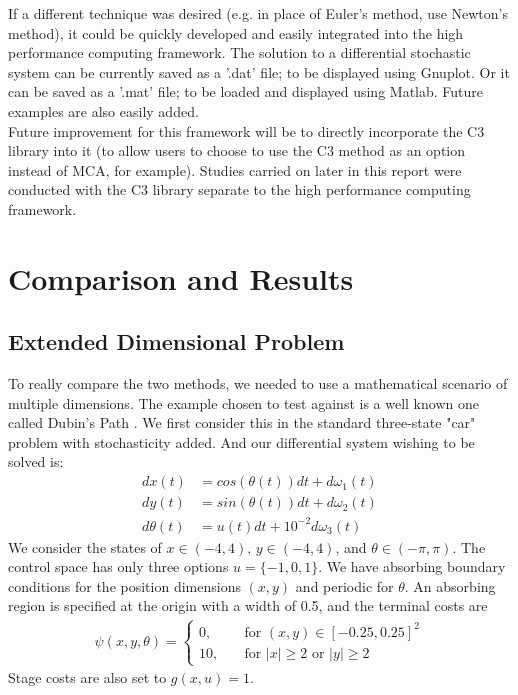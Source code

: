 \documentclass[11pt,draftd]{article}
\begin{document}
If a different technique was desired (e.g. in place of Euler's method, use Newton's method), it could be quickly developed and easily integrated into the high performance computing framework. The solution to a differential stochastic system can be currently saved as a '.dat' file; to be displayed using Gnuplot. Or it can be saved as a '.mat' file; to be loaded and displayed using Matlab. Future examples are also easily added. \\

Future improvement for this framework will be to directly incorporate the C3 library into it (to allow users to choose to use the C3 method as an option instead of MCA, for example). Studies carried on later in this report were conducted with the C3 library separate to the high performance computing framework.
\newpage

\section{Comparison and Results}
\subsection{Extended Dimensional Problem} 
To really compare the two methods, we needed to use a mathematical scenario of multiple dimensions. The example chosen to test against is a well known one called Dubin's Path \cite{reeds}. We first consider this in the standard three-state "car" problem with stochasticity added. And our differential system wishing to be solved is: 
\begin{align*} 
  dx(t) &= cos(\theta(t))dt + d\omega_1 (t) \\ 
  dy(t) &= sin(\theta(t))dt + d\omega_2 (t) \\ 
  d\theta(t) &= u(t)dt + 10^{-2}d\omega_3 (t) 
\end{align*} 
We consider the states of $ x \in (-4,4),\, y\in(-4,4) $, and $ \theta \in (-\pi,\pi) $. The control space has only three options $ u = \{-1, 0, 1\} $. We have absorbing boundary conditions for the position dimensions $ (x,y) $ and periodic for $ \theta $. An absorbing region is specified at the origin with a width of 0.5, and the terminal costs are 
\begin{align*} 
  \psi(x,y,\theta) = \begin{cases} 
  0, \quad & \text{for }(x,y)\in [-0.25, 0.25]^{2} \\ 
  10,\quad & \text{for }|x| \ge 2 \text{ or } |y| \ge 2 
  \end{cases} 
\end{align*} 
Stage costs are also set to $ g(x,u) = 1 $.  
\end{document}

